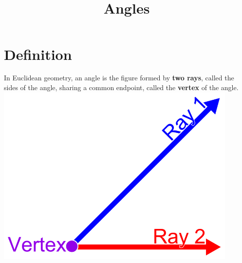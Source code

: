 \documentclass[12pt,a4paper]{article}
\title{Angles}
\author{}
\date{}
\begin{document}
\maketitle

\section{Definition}
In Euclidean geometry, an angle is the figure formed by {\bf two rays}, 
called the sides of the angle, sharing a common endpoint, 
called the {\bf vertex} of the angle. 
\includegraphics[width=0.9\textwidth]{ray.png}
\end{document}
